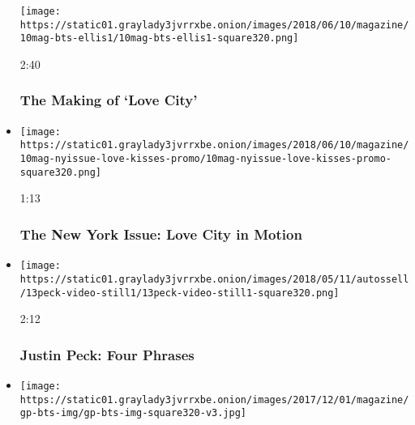 \begin{itemize}
  \texttt{[image: https://static01.graylady3jvrrxbe.onion/images/2018/06/10/magazine/10mag-bts-ellis1/10mag-bts-ellis1-square320.png]}

  2:40

  \hypertarget{the-making-of-love-city}{%
  \subsubsection{The Making of `Love
  City'}\label{the-making-of-love-city}}
\item
  \href{https://www.nytimes3xbfgragh.onion/video/magazine/100000005939489/the-new-york-issue-love-city-in-motion.html?action=click\&module=video-series-bar\&region=header\&pgtype=Article\&playlistId=video/magazine}{}

  \texttt{[image: https://static01.graylady3jvrrxbe.onion/images/2018/06/10/magazine/10mag-nyissue-love-kisses-promo/10mag-nyissue-love-kisses-promo-square320.png]}

  1:13

  \hypertarget{the-new-york-issue-love-city-in-motion}{%
  \subsubsection{The New York Issue: Love City in
  Motion}\label{the-new-york-issue-love-city-in-motion}}
\item
  \href{https://www.nytimes3xbfgragh.onion/video/magazine/100000005893670/four-phrases-justin-peck-ballet-improvisations.html?action=click\&module=video-series-bar\&region=header\&pgtype=Article\&playlistId=video/magazine}{}

  \texttt{[image: https://static01.graylady3jvrrxbe.onion/images/2018/05/11/autossell/13peck-video-still1/13peck-video-still1-square320.png]}

  2:12

  \hypertarget{justin-peck-four-phrases}{%
  \subsubsection{Justin Peck: Four
  Phrases}\label{justin-peck-four-phrases}}
\item
  \href{https://www.nytimes3xbfgragh.onion/video/magazine/100000005593268/behind-the-screams.html?action=click\&module=video-series-bar\&region=header\&pgtype=Article\&playlistId=video/magazine}{}

  \texttt{[image: https://static01.graylady3jvrrxbe.onion/images/2017/12/01/magazine/gp-bts-img/gp-bts-img-square320-v3.jpg]}


\end{itemize}

